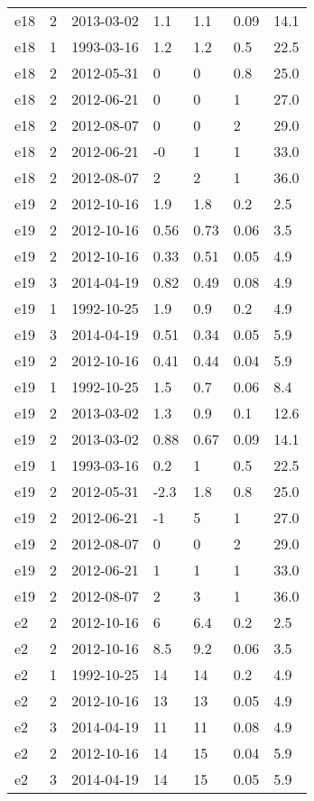 \begin{table*}[htp]
\begin{tabular}{llll}
e18 & 2 & 2013-03-02 & 1.1 & 1.1 & 0.09 & 14.1 \\
e18 & 1 & 1993-03-16 & 1.2 & 1.2 & 0.5 & 22.5 \\
e18 & 2 & 2012-05-31 & 0 & 0 & 0.8 & 25.0 \\
e18 & 2 & 2012-06-21 & 0 & 0 & 1 & 27.0 \\
e18 & 2 & 2012-08-07 & 0 & 0 & 2 & 29.0 \\
e18 & 2 & 2012-06-21 & -0 & 1 & 1 & 33.0 \\
e18 & 2 & 2012-08-07 & 2 & 2 & 1 & 36.0 \\
e19 & 2 & 2012-10-16 & 1.9 & 1.8 & 0.2 & 2.5 \\
e19 & 2 & 2012-10-16 & 0.56 & 0.73 & 0.06 & 3.5 \\
e19 & 2 & 2012-10-16 & 0.33 & 0.51 & 0.05 & 4.9 \\
e19 & 3 & 2014-04-19 & 0.82 & 0.49 & 0.08 & 4.9 \\
e19 & 1 & 1992-10-25 & 1.9 & 0.9 & 0.2 & 4.9 \\
e19 & 3 & 2014-04-19 & 0.51 & 0.34 & 0.05 & 5.9 \\
e19 & 2 & 2012-10-16 & 0.41 & 0.44 & 0.04 & 5.9 \\
e19 & 1 & 1992-10-25 & 1.5 & 0.7 & 0.06 & 8.4 \\
e19 & 2 & 2013-03-02 & 1.3 & 0.9 & 0.1 & 12.6 \\
e19 & 2 & 2013-03-02 & 0.88 & 0.67 & 0.09 & 14.1 \\
e19 & 1 & 1993-03-16 & 0.2 & 1 & 0.5 & 22.5 \\
e19 & 2 & 2012-05-31 & -2.3 & 1.8 & 0.8 & 25.0 \\
e19 & 2 & 2012-06-21 & -1 & 5 & 1 & 27.0 \\
e19 & 2 & 2012-08-07 & 0 & 0 & 2 & 29.0 \\
e19 & 2 & 2012-06-21 & 1 & 1 & 1 & 33.0 \\
e19 & 2 & 2012-08-07 & 2 & 3 & 1 & 36.0 \\
e2 & 2 & 2012-10-16 & 6 & 6.4 & 0.2 & 2.5 \\
e2 & 2 & 2012-10-16 & 8.5 & 9.2 & 0.06 & 3.5 \\
e2 & 1 & 1992-10-25 & 14 & 14 & 0.2 & 4.9 \\
e2 & 2 & 2012-10-16 & 13 & 13 & 0.05 & 4.9 \\
e2 & 3 & 2014-04-19 & 11 & 11 & 0.08 & 4.9 \\
e2 & 2 & 2012-10-16 & 14 & 15 & 0.04 & 5.9 \\
e2 & 3 & 2014-04-19 & 14 & 15 & 0.05 & 5.9 \\

\end{tabular}
\end{table*}
